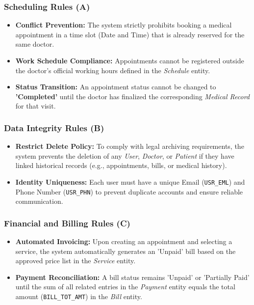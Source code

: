 \subsubsection{Scheduling Rules (A)}
\begin{itemize}
	\item \textbf{Conflict Prevention:} The system strictly prohibits booking a medical appointment in a time slot (Date and Time) that is already reserved for the same doctor.
	\item \textbf{Work Schedule Compliance:} Appointments cannot be registered outside the doctor’s official working hours defined in the \textit{Schedule} entity.
	\item \textbf{Status Transition:} An appointment status cannot be changed to \textbf{'Completed'} until the doctor has finalized the corresponding \textit{Medical Record} for that visit.
\end{itemize}

\subsubsection{Data Integrity Rules (B)}
\begin{itemize}
	\item \textbf{Restrict Delete Policy:} To comply with legal archiving requirements, the system prevents the deletion of any \textit{User}, \textit{Doctor}, or \textit{Patient} if they have linked historical records (e.g., appointments, bills, or medical history).
	\item \textbf{Identity Uniqueness:} Each user must have a unique Email (\texttt{USR\_EML}) and Phone Number (\texttt{USR\_PHN}) to prevent duplicate accounts and ensure reliable communication.
\end{itemize}

\subsubsection{Financial and Billing Rules (C)}
\begin{itemize}
	\item \textbf{Automated Invoicing:} Upon creating an appointment and selecting a service, the system automatically generates an 'Unpaid' bill based on the approved price list in the \textit{Service} entity.
	\item \textbf{Payment Reconciliation:} A bill status remains 'Unpaid' or 'Partially Paid' until the sum of all related entries in the \textit{Payment} entity equals the total amount (\texttt{BILL\_TOT\_AMT}) in the \textit{Bill} entity.
\end{itemize}

